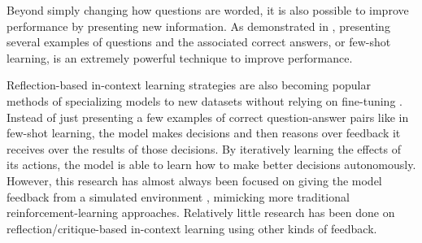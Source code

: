 Beyond simply changing how questions are worded, it is also possible to improve performance by presenting new information. As demonstrated in \citet{FewShot}, presenting several examples of questions and the associated correct answers, or few-shot learning, is an extremely powerful technique to improve performance. 

Reflection-based in-context learning strategies are also becoming popular methods of specializing models to new datasets without relying on fine-tuning \citep{NEURIPS2023_1b44b878, yao2023react, NEURIPS2023_91edff07, yang2025thelight}. Instead of just presenting a few examples of correct question-answer pairs like in few-shot learning, the model makes decisions and then reasons over feedback it receives over the results of those decisions. By iteratively learning the effects of its actions, the model is able to learn how to make better decisions autonomously. However, this research has almost always been focused on giving the model feedback from a simulated environment \citep{Voyager, zhang2025spiralsymbolicllmplanning}, mimicking more traditional reinforcement-learning approaches. Relatively little research has been done on reflection/critique-based in-context learning using other kinds of feedback.
